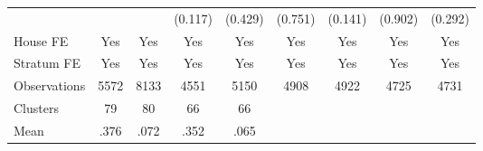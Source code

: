 {\begin{tabular}{l*{8}{c}}
                &                  &                  &  (0.117)         &  (0.429)         &  (0.751)         &  (0.141)         &  (0.902)         &  (0.292)         \\
House FE        &      Yes         &      Yes         &      Yes         &      Yes         &      Yes         &      Yes         &      Yes         &      Yes         \\
Stratum FE      &      Yes         &      Yes         &      Yes         &      Yes         &      Yes         &      Yes         &      Yes         &      Yes         \\
\midrule
Observations    &     5572         &     8133         &     4551         &     5150         &     4908         &     4922         &     4725         &     4731         \\
Clusters        &       79         &       80         &       66         &       66         &                  &                  &                  &                  \\
Mean            &     .376         &     .072         &     .352         &     .065         &                  &                  &                  &                  \\
\bottomrule
\end{tabular}
}
